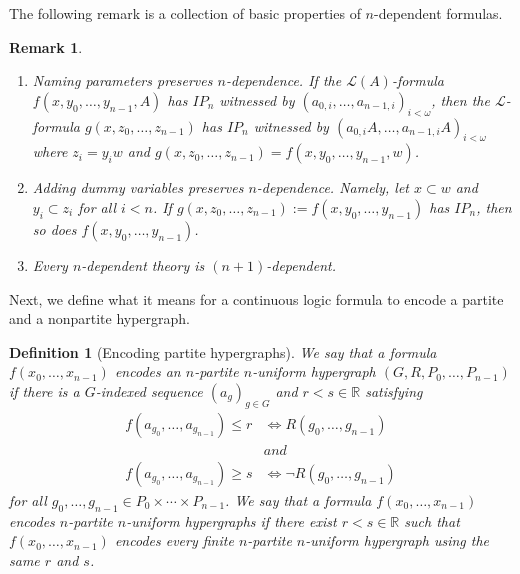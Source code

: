 \documentclass{amsart}
\newtheorem{defin}[teor]{Definition}
\newtheorem{remark}[teor]{Remark}
\newtheorem{external claim}[teor]{Claim}
\newcommand{\mL}{\mathcal{L}}
\begin{document}
The following remark is a collection of basic properties of $n$-dependent formulas.

\begin{remark} \label{naming parameters and dummy variables}
    \begin{enumerate}
        \item Naming parameters preserves $n$-dependence. If the $\mL(A)$-formula $f(x,y_0,\dots,y_{n-1},A)$ has $IP_n$ witnessed by $(a_{0,i},\dots, a_{n-1,i})_{i< \omega}$, then the $\mL$-formula $g(x,z_0,\dots,z_{n-1})$ has $IP_n$ witnessed by $(a_{0,i}A,\dots, a_{n-1,i}A)_{i< \omega}$ where $z_i=y_iw$ and $g(x,z_0,\dots,z_{n-1})=f(x,y_0,\dots,y_{n-1},w)$.
        \item Adding dummy variables preserves $n$-dependence. Namely, let $x\subset w$ and $y_i\subset z_i$ for all $i<n$. If $g(x,z_0,\dots,z_{n-1}):=f(x,y_0,\dots,y_{n-1})$ has $IP_n$, then so does $f(x,y_0,\dots,y_{n-1})$.
        \item Every $n$-dependent theory is $(n+1)$-dependent.
    \end{enumerate}
\end{remark}

Next, we define what it means for a continuous logic formula to encode a partite and a nonpartite hypergraph.

\begin{defin}[Encoding partite hypergraphs]
    We say that a formula $f(x_0,\dots,x_{n-1})$ \emph{encodes an $n$-partite $n$-uniform hypergraph} $(G,R,P_0,\dots,P_{n-1})$ if there is a $G$-indexed sequence $(a_g)_{g\in G}$ and $r<s\in\mathbb{R}$ satisfying 
    \begin{align*}
    f( a_{g_0},\dots, a_{g_{n-1}}  )\leq r &\iff  R(g_0,\dots, g_{n-1})\\
    &and\\
    f(a_{g_0},\dots, a_{g_{n-1}}  )\geq s &\iff \neg R(g_0,\dots, g_{n-1})
    \end{align*}
    for all $g_0,\dots,g_{n-1}\in P_0\times\cdots\times P_{n-1}$.
    We say that a formula $f(x_0,\dots,x_{n-1})$ \emph{ encodes $n$-partite $n$-uniform hypergraphs} if there exist $r<s\in\mathbb{R}$ such that $f(x_0,\dots,x_{n-1})$ encodes every finite $n$-partite $n$-uniform hypergraph using the same $r$ and $s$.
\end{defin}
\end{document}
